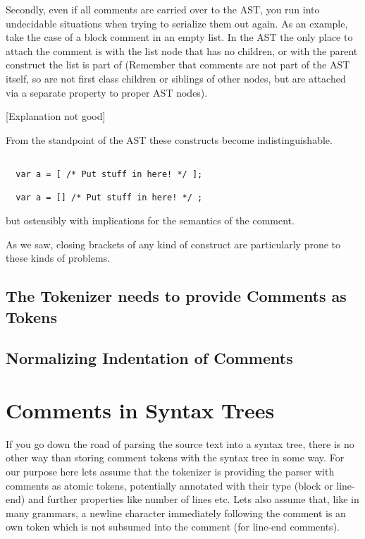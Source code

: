 \documentclass[11pt,a4paper]{article}
\begin{document}
Secondly, even if all comments are carried over to the AST, you run into
undecidable situations when trying to serialize them out again. As an example,
take the case of a block comment in an empty list. In the AST the only place to
attach the comment is with the list node that has no children, or with the
parent construct the list is part of (Remember that
comments are not part of the AST itself, so are not first class children or
siblings of
other nodes,  but are attached via a separate property to proper AST nodes).

[Explanation not good]

From the standpoint of the AST these constructs become indistinguishable.

\begin{verbatim}

  var a = [ /* Put stuff in here! */ ];

  var a = [] /* Put stuff in here! */ ;

\end{verbatim}

but ostensibly with implications for the semantics of the comment.

As we saw, closing brackets of any kind of construct are
particularly prone to these kinds of problems.




\subsection{The Tokenizer needs to provide Comments as Tokens}

\subsection{Normalizing Indentation of Comments}


\section{Comments in Syntax Trees}

If you go down the road of parsing the source text into a syntax tree, there is
no other way than storing comment tokens with the syntax tree in some way. For
our purpose here lets assume that the tokenizer is providing the parser with
comments as atomic tokens, potentially annotated with their type (block or
line-end) and further properties like number of lines etc. Lets also assume
that, like in many grammars, a newline character immediately following the
comment is an own token which is not subsumed into the comment (for line-end
comments).
\end{document}
